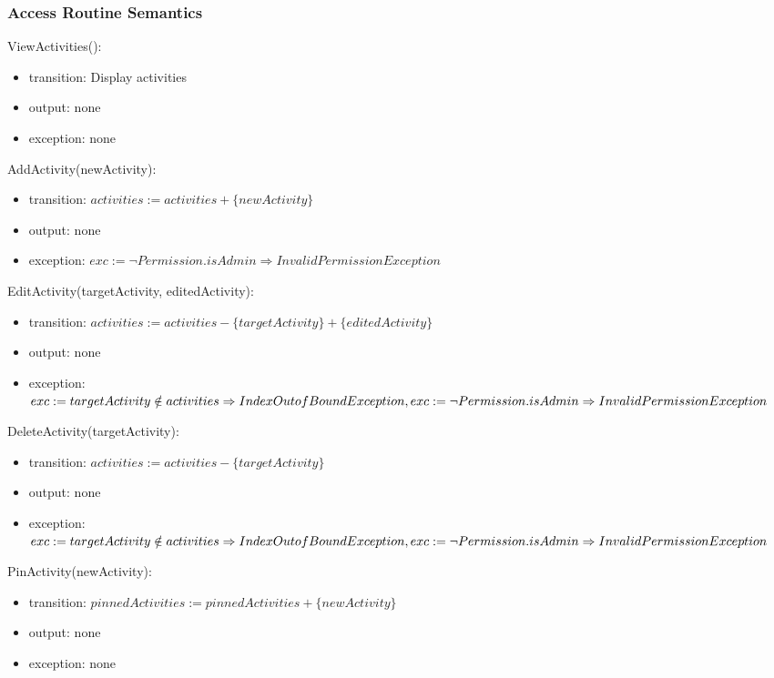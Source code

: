 \documentclass[12pt, titlepage]{article}
\begin{document}
\subsubsection{Access Routine Semantics}

\noindent ViewActivities():
\begin{itemize}
\item transition: Display activities
\item output: none
\item exception: none
\end{itemize}

\noindent AddActivity(newActivity):
\begin{itemize}
\item transition: $activities := activities + \{newActivity\}$
\item output: none
\item exception: $exc := \neg Permission.isAdmin \Rightarrow InvalidPermission Exception$
\end{itemize}

\noindent EditActivity(targetActivity, editedActivity):
\begin{itemize}
\item transition: $activities := activities - \{targetActivity\} + \{editedActivity\}$
\item output: none
\item exception: $exc := targetActivity \notin activities \Rightarrow IndexOutofBound Exception,\\ 
                  exc := \neg Permission.isAdmin \Rightarrow InvalidPermission Exception$
\end{itemize}

\noindent DeleteActivity(targetActivity):
\begin{itemize}
\item transition: $activities := activities - \{targetActivity\}$
\item output: none
\item exception: $exc := targetActivity \notin activities \Rightarrow IndexOutofBound Exception,\\
                  exc := \neg Permission.isAdmin \Rightarrow InvalidPermission Exception$
\end{itemize}

\noindent PinActivity(newActivity):
\begin{itemize}
\item transition: $pinnedActivities := pinnedActivities + \{newActivity\}$
\item output: none
\item exception: none
\end{itemize}
\end{document}
